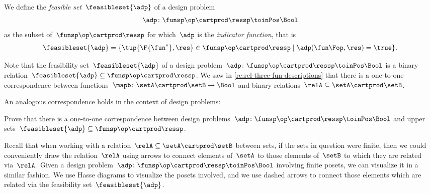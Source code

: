 \begin{definition}
    \label{def:dp-feasible-set}
    We define the \emph{feasible set}~$\feasibleset{\adp}$ of a design problem~
    \begin{equation}
        \label{eq:generic-design-prob}
        \adp\colon \funsp\op \cartprod \ressp \toinPos \Bool
    \end{equation}
    as the subset of~$\funsp \op\cartprod \ressp$ for which~$\adp$ is the \emph{indicator function}, that is%
    \begin{equation}
        \label{eq:design-prob-as-upper-set}
        \feasibleset{\adp} = \{ \tup{\F{\fun^*},\res} \in \funsp \op\cartprod \ressp  \mid %
        \adp(\fun\Fop, \res) = \true %
        \}.
    \end{equation}
\end{definition}

Note that the feasibility set~$\feasibleset{\adp}$ of a design problem~$\adp \colon \funsp \op \cartprod \ressp\toinPos \Bool$ is a binary relation~$\feasibleset{\adp} \subseteq \funsp\op \cartprod \ressp$.
We saw in \cref{re:rel-three-fun-descriptions} that there is a one-to-one correspondence between functions~$\mapb \colon \setA \cartprod \setB \to \Bool$ and binary relations~$\relA \subseteq \setA \cartprod \setB$.

An analogous correspondence holds in the context of design problems:

\begin{exercise}
    \label{ex:adp-uppersets}
    Prove that there is a one-to-one correspondence between design problems~$\adp \colon \funsp \op \cartprod \ressp\toinPos \Bool$ and upper sets~$\feasibleset{\adp} \subseteq \funsp\op \cartprod \ressp$.
\end{exercise}
\begin{solution}
    \missingsolution
\end{solution}

Recall that when working with a relation~$\relA \subseteq \setA \cartprod \setB$ between sets, if the sets in question were finite, then we could conveniently draw the relation~$\relA$ using arrows to connect elements of~$\setA$ to those elements of~$\setB$ to which they are related via~$\relA$.
Given a design problem~$\adp \colon \funsp \op \cartprod \ressp\toinPos \Bool$ involving finite posets, we can visualize it in a similar fashion.
We use Hasse diagrams to visualize the posets involved, and we use dashed arrows to connect those elements which are related via the feasibility set~$\feasibleset{\adp}$.

